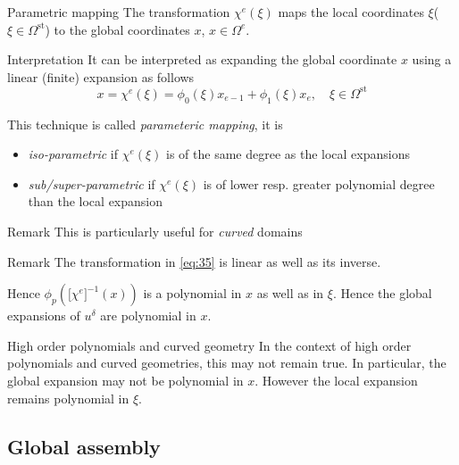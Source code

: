 \begin{frame}{Parametric mapping}
  The transformation $\chi^e(\xi)$ maps the local coordinates
  $\xi$($\xi \in \Omega^{\text{st}}$) to the global coordinates $x$,
  $x \in \Omega^e$.

  \begin{block}{Interpretation}
    It can be interpreted as expanding the global coordinate $x$ using a linear (finite) expansion as follows
    \begin{equation}
      \label{eq:35}
      x = \chi^e(\xi) = \phi_0(\xi) x_{e-1} + \phi_1(\xi) x_e, \quad \xi \in \Omega^{\text{st}}
    \end{equation}
  \end{block}

  This technique is called \emph{parameteric mapping}, it is
  \begin{itemize}
  \item \emph{iso-parametric} if $\chi^e(\xi)$ is of the same degree as the local expansions
  \item \emph{sub/super-parametric} if $\chi^e(\xi)$ is of lower resp. greater polynomial degree than the local expansion
  \end{itemize}
  \begin{block}{Remark}
    This is particularly useful for \emph{curved} domains
  \end{block}
\end{frame}
\begin{frame}{Remark}
  The transformation in \eqref{eq:35} is linear as well as its inverse.

  Hence $\phi_p(\Big[\chi^e\Big]^{-1} (x))$ is a polynomial in $x$ as
  well as in $\xi$. Hence the global expansions of $u^{\delta}$ are
  polynomial in $x$.

  \begin{alertblock}{High order polynomials and curved geometry}
    In the context of high order polynomials and curved geometries,
    this may not remain true. In particular, the global expansion may
    not be polynomial in $x$. However the local expansion remains
    polynomial in $\xi$.
  \end{alertblock}
\end{frame}


\subsection{Global assembly}
\label{sec:glonbal-assembly}

